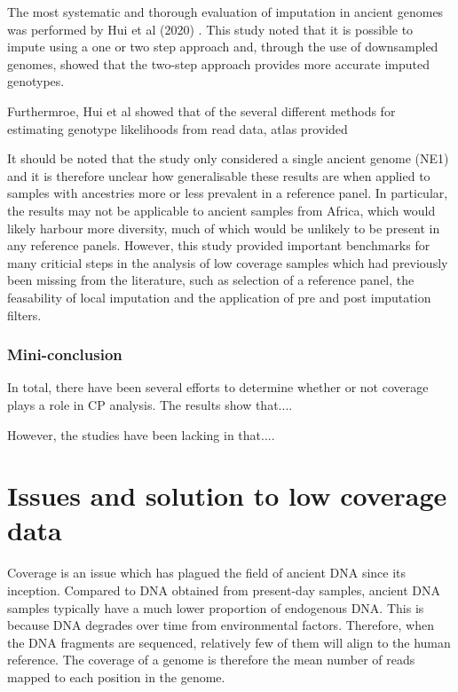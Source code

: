The most systematic and thorough evaluation of imputation in ancient genomes was performed by Hui et al (2020) \cite{hui2020evaluating}. This study noted that it is possible to impute using a one or two step approach and, through the use of downsampled genomes, showed that the two-step approach provides more accurate imputed genotypes. 

Furthermroe, Hui et al showed that of the several different methods for estimating genotype likelihoods from read data, atlas provided 

It should be noted that the study only considered a single ancient genome (NE1) and it is therefore unclear how generalisable these results are when applied to samples with ancestries more or less prevalent in a reference panel.  In particular, the results may not be applicable to ancient samples from Africa, which would likely harbour more diversity, much of which would be unlikely to be present in any reference panels. However, this study provided important benchmarks for many criticial steps in the analysis of low coverage samples which had previously been missing from the literature, such as selection of a reference panel, the feasability of local imputation and the application of pre and post imputation filters. 



\subsubsection{Mini-conclusion}

In total, there have been several efforts to determine whether or not coverage plays a role in CP analysis. The results show that....

However, the studies have been lacking in that....


\section{Issues and solution to low coverage data}

Coverage is an issue which has plagued the field of ancient DNA since its inception. Compared to DNA obtained from present-day samples, ancient DNA samples typically have a much lower proportion of endogenous DNA. This is because DNA degrades over time from environmental factors. Therefore, when the DNA fragments are sequenced, relatively few of them will align to the human reference. The coverage of a genome is therefore the mean number of reads mapped to each position in the genome. 

